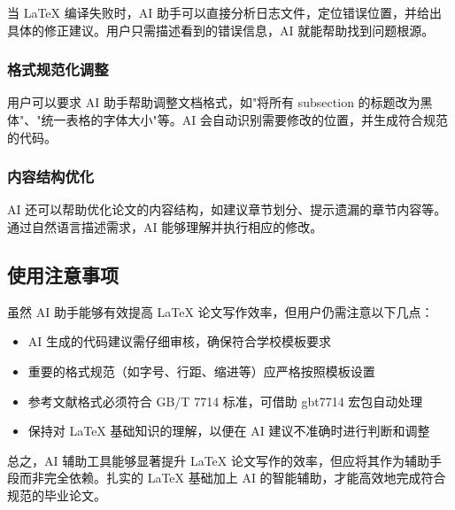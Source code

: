 当 \LaTeX{} 编译失败时，AI 助手可以直接分析日志文件，定位错误位置，并给出具体的修正建议。用户只需描述看到的错误信息，AI 就能帮助找到问题根源。

\subsubsection{格式规范化调整}

用户可以要求 AI 助手帮助调整文档格式，如"将所有 subsection 的标题改为黑体"、"统一表格的字体大小"等。AI 会自动识别需要修改的位置，并生成符合规范的代码。

\subsubsection{内容结构优化}

AI 还可以帮助优化论文的内容结构，如建议章节划分、提示遗漏的章节内容等。通过自然语言描述需求，AI 能够理解并执行相应的修改。

\subsection{使用注意事项}

虽然 AI 助手能够有效提高 \LaTeX{} 论文写作效率，但用户仍需注意以下几点：

\begin{itemize}
   \item AI 生成的代码建议需仔细审核，确保符合学校模板要求
   \item 重要的格式规范（如字号、行距、缩进等）应严格按照模板设置
   \item 参考文献格式必须符合 GB/T 7714 标准，可借助 gbt7714 宏包自动处理
   \item 保持对 \LaTeX{} 基础知识的理解，以便在 AI 建议不准确时进行判断和调整
\end{itemize}

总之，AI 辅助工具能够显著提升 \LaTeX{} 论文写作的效率，但应将其作为辅助手段而非完全依赖。扎实的 \LaTeX{} 基础加上 AI 的智能辅助，才能高效地完成符合规范的毕业论文。